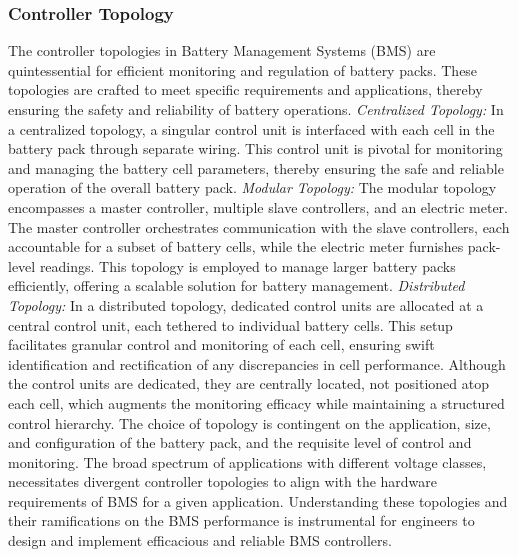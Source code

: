 \subsubsection{Controller Topology}\label{subsec:CnTp}
The controller topologies in Battery Management Systems (BMS) are quintessential for efficient monitoring and regulation of battery packs. These topologies are crafted to meet specific requirements and applications, thereby ensuring the safety and reliability of battery operations.\newline\newline
\noindent
\emph{Centralized Topology:}\newline
\noindent
In a centralized topology, a singular control unit is interfaced with each cell in the battery pack through separate wiring. This control unit is pivotal for monitoring and managing the battery cell parameters, thereby ensuring the safe and reliable operation of the overall battery pack\cite{7}.\newline\newline
\noindent
\emph{Modular Topology:}\newline
\noindent
The modular topology encompasses a master controller, multiple slave controllers, and an electric meter. The master controller orchestrates communication with the slave controllers, each accountable for a subset of battery cells, while the electric meter furnishes pack-level readings. This topology is employed to manage larger battery packs efficiently, offering a scalable solution for battery management\cite{8}.\newline\newline
\noindent
\emph{Distributed Topology:}\newline
\noindent
In a distributed topology, dedicated control units are allocated at a central control unit, each tethered to individual battery cells. This setup facilitates granular control and monitoring of each cell, ensuring swift identification and rectification of any discrepancies in cell performance. Although the control units are dedicated, they are centrally located, not positioned atop each cell, which augments the monitoring efficacy while maintaining a structured control hierarchy\cite{9}.\newline\newline
\noindent
The choice of topology is contingent on the application, size, and configuration of the battery pack, and the requisite level of control and monitoring. The broad spectrum of applications with different voltage classes, necessitates divergent controller topologies to align with the hardware requirements of BMS for a given application. Understanding these topologies and their ramifications on the BMS performance is instrumental for engineers to design and implement efficacious and reliable BMS controllers.
